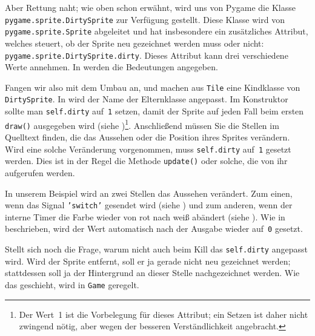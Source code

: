 
Aber Rettung naht; wie oben schon erwähnt, wird uns von Pygame die Klasse \texttt{pygame\-.sprite\-.Dirty\-Sprite} zur Verfügung gestellt. Diese Klasse wird von \texttt{pygame\-.sprite\-.Sprite} abgeleitet und hat insbesondere ein zusätzliches Attribut, welches steuert, ob der Sprite neu gezeichnet werden muss oder nicht: \texttt{pygame.sprite.DirtySprite.dirty}. Dieses Attribut kann drei verschiedene Werte annehmen. In  werden die Bedeutungen angegeben. 


Fangen wir also mit dem Umbau an, und machen aus \texttt{Tile} eine Kindklasse von \texttt{Dirty\-Sprite}. In  wird der Name der Elternklasse angepasst. Im Konstruktor sollte man \texttt{self.dirty} auf~\texttt{1} setzen, damit der Sprite auf jeden Fall beim ersten \texttt{draw()} ausgegeben wird (siehe )\footnote{Der Wert~1 ist die Vorbelegung für dieses Attribut; ein Setzen ist daher nicht zwingend nötig, aber wegen der besseren Verständlichkeit angebracht.}. Anschließend müssen Sie die Stellen im Quelltext finden, die das Aussehen oder die Position ihres Sprites verändern. Wird eine solche Veränderung vorgenommen, muss \texttt{self.dirty} auf~\texttt{1} gesetzt werden. Dies ist in der Regel die Methode \texttt{update()} oder solche, die von ihr aufgerufen werden. 

In unserem Beispiel wird an zwei Stellen das Aussehen verändert. Zum einen, wenn das Signal \texttt{'switch'} gesendet wird (siehe ) und zum anderen, wenn der interne Timer die Farbe wieder von rot nach weiß abändert (siehe ). Wie in  beschrieben, wird der Wert automatisch nach der Ausgabe wieder auf~\texttt{0} gesetzt.

Stellt sich noch die Frage, warum nicht auch beim Kill das \texttt{self.dirty} angepasst wird. Wird der Sprite entfernt, soll er ja gerade nicht neu gezeichnet werden; stattdessen soll ja der Hintergrund an dieser Stelle nachgezeichnet werden. Wie das geschieht, wird in \texttt{Game} geregelt.


